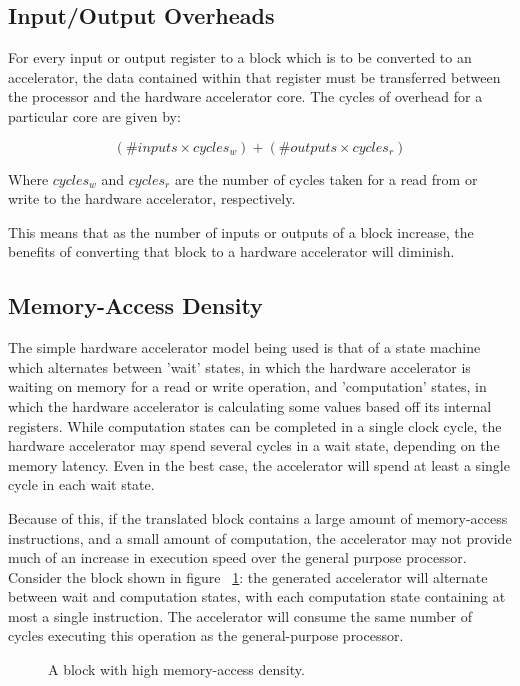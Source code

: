 \documentclass{UoYCSproject}
\newenvironment{monospace}{\ttfamily}{\par}
\begin{document}
\subsection{Input/Output Overheads}

For every input or output register to a block which is to be converted to an accelerator, the data contained within that register
must be transferred between the processor and the hardware accelerator core. The cycles of overhead for a particular core are
given by:

\begin{center}
\[ (\#inputs \times cycles_w) + (\#outputs \times cycles_r) \]
\end{center}

Where \(cycles_w\) and \(cycles_r\) are the number of cycles taken for a read from or write to the hardware accelerator,
respectively.

This means that as the number of inputs or outputs of a block increase, the benefits of converting that block to a hardware
accelerator will diminish.

\subsection{Memory-Access Density}

The simple hardware accelerator model being used is that of a state machine which alternates between 'wait' states,
in which the hardware accelerator is waiting on memory for a read or write operation, and 'computation' states,
in which the hardware accelerator is calculating some values based off its internal registers. While computation states
can be completed in a single clock cycle, the hardware accelerator may spend several cycles in a wait state, depending
on the memory latency. Even in the best case, the accelerator will spend at least a single cycle in each wait state.

Because of this, if the translated block contains a large amount of memory-access instructions, and a small amount of computation,
the accelerator may not provide much of an increase in execution speed over the general purpose processor. Consider the block
shown in figure ~\ref{fig:highMemoryDensity}: the generated accelerator will alternate between wait and computation states,
with each computation state containing at most a single instruction. The accelerator will consume the same number of cycles
executing this operation as the general-purpose processor.

\begin{figure}[h]
  \begin{center}
    \begin{minipage}{0.5\linewidth}
      \begin{monospace}
      
      \end{monospace}
    \end{minipage}
  \end{center}

  \caption{A block with high memory-access density.}
  \label{fig:highMemoryDensity}
\end{figure}
\end{document}
